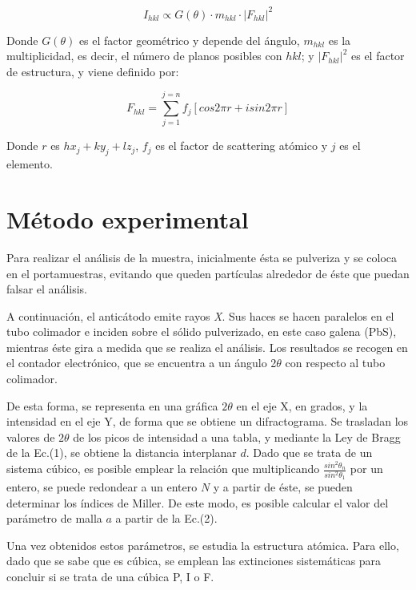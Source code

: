\documentclass[a4paper,twocolumn,10pt]{article}
\begin{document}
\begin{equation}
I_{hkl} \propto G(\theta) \cdot m_{hkl} \cdot |F_{hkl}|^2
\end{equation}

Donde $G(\theta)$ es el factor geométrico y depende del ángulo, $m_{hkl}$ es la multiplicidad, es decir, el número de planos posibles con $hkl$; y $|F_{hkl}|^2$ es el factor de estructura, y viene definido por:

\begin{equation}
F_{hkl} = \sum_{j=1}^{j=n} f_j[cos2\pi r  + isin2\pi r]
\end{equation}


Donde $r$ es $hx_j + ky_j + lz_j$, $f_j$ es el factor de scattering atómico y $j$ es el elemento.

\section{Método experimental}

 Para realizar el análisis de la muestra, inicialmente ésta se pulveriza y se coloca en el portamuestras, evitando que queden partículas alrededor de éste que puedan falsar el análisis. 
 
  A continuación, el anticátodo emite rayos \textit{X}. Sus  haces se hacen paralelos en el tubo colimador e inciden sobre el sólido pulverizado, en este caso galena (PbS), mientras éste gira a medida que se realiza el análisis. Los resultados se recogen en el contador electrónico, que se encuentra a un ángulo 2$\theta$ con respecto al tubo colimador. 
  
 De esta forma, se representa en una gráfica  $2\theta$ en el eje X, en grados, y la intensidad en el eje Y, de forma que se obtiene un difractograma. Se trasladan los valores de $2\theta$ de los picos de intensidad a una tabla, y mediante la Ley de Bragg de la Ec.(1), se obtiene la distancia interplanar $d$. Dado que se trata de un sistema cúbico, es posible emplear la relación que multiplicando $\frac{sin^2\theta_n}{sin^2\theta_1}$ por un entero, se puede redondear a un entero $N$ y a partir de éste, se pueden determinar los índices de Miller. De este modo, es posible calcular el valor del parámetro de malla $a$ a partir de la Ec.(2).

Una vez obtenidos estos parámetros, se estudia la estructura atómica. Para ello, dado que se sabe que es cúbica, se emplean las extinciones sistemáticas para concluir si se trata de una cúbica P, I o F.
\end{document}
